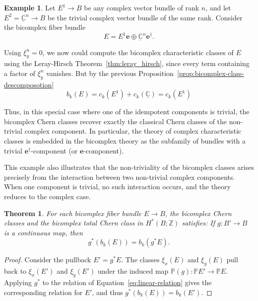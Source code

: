 \documentclass[11pt]{amsart}
\newcommand{\C}{\mathbb{C}}          %
\newcommand{\Z}{\mathbb{Z}}
\renewcommand{\P}{\mathbb{P}}
\newcommand{\e}{\mathbf{e}}          %
\newcommand{\ed}{\mathbf{e}^\dagger} %
\newcommand{\wb}{b}
\newtheorem{thm}[prop]{Theorem}
\theoremstyle{definition}
\newtheorem{example}[prop]{Example}       %
\begin{document}
\begin{example}\label{ex:trivial-component}
Let $E^1 \to B$ be any complex vector bundle of rank $n$, and let $E^2 = \underline{\C}^n \to B$ be the trivial complex vector bundle of the same rank. Consider the bicomplex fiber bundle
\begin{equation*}
E = E^1\e \oplus \underline{\C}^n\ed.
\end{equation*}

Using $\xi_y^n = 0$, we now could compute the bicomplex characteristic classes of $E$ using the Leray-Hirsch Theorem~\ref{thm:leray_hirsch}, since every term containing a factor of $\xi_y^n$ vanishes. But by the previous Proposition~\ref{prop:bicomplex-class-descomposotion} 
\begin{equation*}
    \wb_k(E)=c_k(E^1)+c_k(\underline{\C})=c_k(E^1)
\end{equation*}

Thus, in this special case where one of the idempotent components is trivial, the bicomplex Chern classes recover exactly the classical Chern classes of the non-trivial complex component. In particular, the theory of complex characteristic classes is embedded in the bicomplex theory as the subfamily of bundles with a trivial $\ed$-component (or $\e$-component).

This example also illustrates that the non-triviality of the bicomplex classes arises precisely from the interaction between two non-trivial complex components. When one component is trivial, no such interaction occurs, and the theory reduces to the complex case.
\end{example}




\begin{thm}\label{thm:bicomplex_chern_properties}
    For each bicomplex fiber bundle $E \to B$, the bicomplex Chern classes and the bicomplex total Chern class in $H^*(B;\Z)$ satisfies: If $g: B' \to B$ is a continuous map, then
        \begin{equation*}
            g^*(\wb_k(E)) = \wb_k(g^*E).
        \end{equation*} 
    \end{thm}
    
\begin{proof}
    Consider the pullback $E' = g^*E$. The classes $\xi_x(E)$ and $\xi_y(E)$ pull back to $\xi_x(E')$ and $\xi_y(E')$ under the induced map $\P(g): \P E' \to \P E$. Applying $g^*$ to the relation of Equation~\eqref{eq:linear-relation} gives the corresponding relation for $E'$, and thus $g^*(b_k(E)) = b_k(E')$.
\end{proof}
\end{document}
